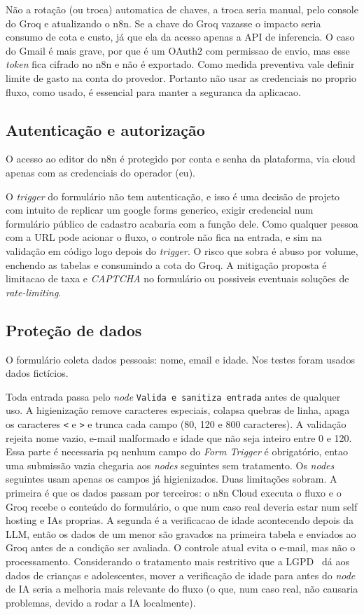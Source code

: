 \documentclass[article,11pt,oneside,a4paper,brazil,section=TITLE]{abntex2}
\begin{document}
Não a rotação (ou troca) automatica de chaves, a troca seria manual, pelo console do Groq e atualizando o n8n. Se a chave do Groq vazasse o impacto seria consumo de cota e custo, já que ela da acesso apenas a API de inferencia. O caso do Gmail é mais grave, por que é um OAuth2 com permissao de envio, mas esse \emph{token} fica cifrado no n8n e não é exportado. Como medida preventiva vale definir limite de gasto na conta do provedor. Portanto não usar as credenciais no proprio fluxo, como usado, é essencial para manter a seguranca da aplicacao.

\subsection{Autenticação e autorização}

O acesso ao editor do n8n é protegido por conta e senha da plataforma, via cloud apenas com as credenciais do operador (eu).

O \emph{trigger} do formulário não tem autenticação, e isso é uma decisão de projeto com intuito de replicar um google forms generico, exigir credencial num formulário público de cadastro acabaria com a função dele. Como qualquer pessoa com a URL pode acionar o fluxo, o controle não fica na entrada, e sim na validação em código logo depois do \emph{trigger}. O risco que sobra é abuso por volume, enchendo as tabelas e consumindo a cota do Groq. A mitigação proposta é limitacao de taxa e \emph{CAPTCHA} no formulário ou possiveis eventuais soluções de \emph{rate-limiting}.

\subsection{Proteção de dados}

O formulário coleta dados pessoais: nome, email e idade. Nos testes foram usados dados fictícios.

Toda entrada passa pelo \emph{node} \texttt{Valida e sanitiza entrada} antes de qualquer uso. A higienização remove caracteres especiais, colapsa quebras de linha, apaga os caracteres \texttt{<} e \texttt{>} e trunca cada campo (80, 120 e 800 caracteres). A validação rejeita nome vazio, e-mail malformado e idade que não seja inteiro entre 0 e 120. Essa parte é necessaria pq nenhum campo do \emph{Form Trigger} é obrigatório, entao uma submissão vazia chegaria aos \emph{nodes} seguintes sem tratamento. Os \emph{nodes} seguintes usam apenas os campos já higienizados. Duas limitações sobram. A primeira é que os dados passam por terceiros: o n8n Cloud executa o fluxo e o Groq recebe o conteúdo do formulário, o que num caso real deveria estar num self hosting e IAs proprias. A segunda é a verificacao de idade acontecendo depois da LLM, então os dados de um menor são gravados na primeira tabela e enviados ao Groq antes de a condição ser avaliada. O controle atual evita o e-mail, mas não o processamento. Considerando o tratamento mais restritivo que a LGPD~\cite{lgpd} dá aos dados de crianças e adolescentes, mover a verificação de idade para antes do \emph{node} de IA seria a melhoria mais relevante do fluxo (o que, num caso real, não causaria problemas, devido a rodar a IA localmente).
\end{document}
